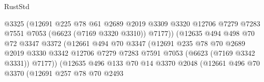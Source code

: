 \begin{lexlean}{RustStd}
\begin{coremodule}
                                    @3325
                                    (@12691
                                      @225
                                      @78
                                      @61
                                      @2689
                                      @2019
                                      @3309
                                      @3320
                                      @12706
                                      @7279
                                      @7283
                                      @7551
                                      @7053
                                      (@6623 (@7169 @3320 @3310))
                                      @7177))
                                  (@12635
                                    @494
                                    @498
                                    @70
                                    @72
                                    @3347
                                    @3372
                                    (@12661
                                      @494
                                      @70
                                      @3347
                                      (@12691
                                        @235
                                        @78
                                        @70
                                        @2689
                                        @2019
                                        @3330
                                        @3342
                                        @12706
                                        @7279
                                        @7283
                                        @7591
                                        @7053
                                        (@6623 (@7169 @3342 @3331))
                                        @7177))
                                    (@12635
                                      @496
                                      @133
                                      @70
                                      @14
                                      @3370
                                      @2048
                                      (@12661
                                        @496
                                        @70
                                        @3370
                                        (@12691
                                          @257
                                          @78
                                          @70
                                          @2493

\end{coremodule}
\end{lexlean}

